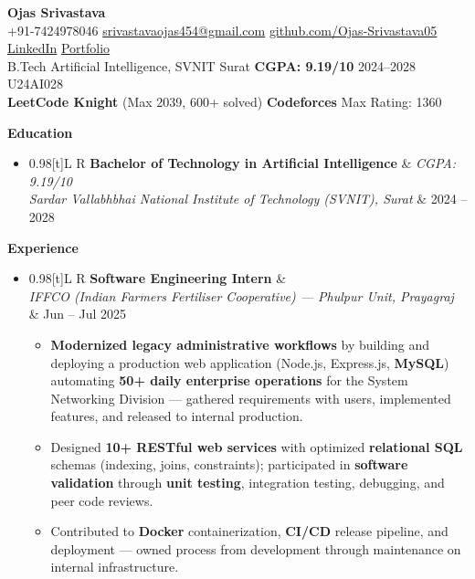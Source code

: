 \documentclass[a4paper,10pt]{article}
\newcommand{\resumeSubheading}[4]{
  \vspace{0.5mm}\item
  \begin{tabularx}{0.98\textwidth}[t]{L R}
    \textbf{#1} & \textit{\footnotesize #4} \\
    \textit{\footnotesize #3} & \footnotesize #2 \\
  \end{tabularx}
  \vspace{-2.4mm}
}
\newcommand{\resumeSubHeadingListStart}{\begin{itemize}[leftmargin=*,labelsep=0mm]}
\newcommand{\resumeSubHeadingListEnd}{\end{itemize}\vspace{0.5mm}}
\newcommand{\resumeItemListStart}{\begin{justify}\begin{itemize}[leftmargin=3ex, rightmargin=2ex, noitemsep,labelsep=1.2mm,itemsep=0mm]\small}
\newcommand{\resumeItemListEnd}{\end{itemize}\end{justify}\vspace{-2mm}}
\newcommand{\cvsection}[1]{%
  \vspace{0.8mm}
  \begin{tcolorbox}
    \textbf{\large #1}
  \end{tcolorbox}
  \vspace{-4mm}
}
\begin{document}
\selectfont

\begin{center}
  {\LARGE \textbf{Ojas Srivastava}} \\[1mm]
  \small
  +91-7424978046 \textbar{}
  \href{mailto:srivastavaojas454@gmail.com}{srivastavaojas454@gmail.com} \textbar{}
  \href{https://github.com/Ojas-Srivastava05}{github.com/Ojas-Srivastava05} \textbar{}
  \href{https://linkedin.com/in/ojas-srivastava05}{LinkedIn} \textbar{}
  \href{https://ojas-srivastava.vercel.app}{Portfolio} \\[0.5mm]
  \small
  B.Tech Artificial Intelligence, SVNIT Surat \textbar{}
  \textbf{CGPA: 9.19/10} \textbar{}
  2024--2028 \textbar{}
  U24AI028 \\[0.5mm]
  \small
  \textbf{LeetCode Knight} (Max 2039, 600+ solved) \textbar{}
  \textbf{Codeforces} Max Rating: 1360
\end{center}

\vspace{-2.5mm}

\cvsection{Education}
\resumeSubHeadingListStart
  \resumeSubheading
    {Bachelor of Technology in Artificial Intelligence}{2024 -- 2028}
    {Sardar Vallabhbhai National Institute of Technology (SVNIT), Surat}{CGPA: 9.19/10}
\resumeSubHeadingListEnd

\cvsection{Experience}
\resumeSubHeadingListStart
  \resumeSubheading
    {Software Engineering Intern}{Jun -- Jul 2025}
    {IFFCO (Indian Farmers Fertiliser Cooperative) --- Phulpur Unit, Prayagraj}{}
    \resumeItemListStart
      \item \textbf{Modernized legacy administrative workflows} by building and deploying a production web application (Node.js, Express.js, \textbf{MySQL}) automating \textbf{50+ daily enterprise operations} for the System Networking Division --- gathered requirements with users, implemented features, and released to internal production.
      \item Designed \textbf{10+ RESTful web services} with optimized \textbf{relational SQL} schemas (indexing, joins, constraints); participated in \textbf{software validation} through \textbf{unit testing}, integration testing, debugging, and peer code reviews.
      \item Contributed to \textbf{Docker} containerization, \textbf{CI/CD} release pipeline, and deployment --- owned process from development through maintenance on internal infrastructure.
    \resumeItemListEnd
\resumeSubHeadingListEnd
\end{document}
